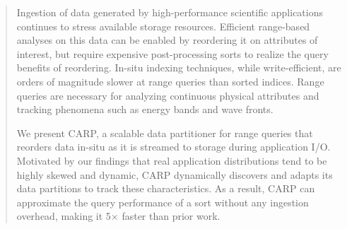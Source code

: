 \begin{abstract}

  Ingestion of data generated by high-performance scientific applications continues to stress available storage resources. Efficient range-based analyses on this data can be enabled by reordering it on attributes of interest, but require expensive post-processing sorts to realize the query benefits of reordering. In-situ indexing techniques, while write-efficient, are orders of magnitude slower at range queries than sorted indices. Range queries are necessary for analyzing continuous physical attributes and tracking phenomena such as energy bands and wave fronts.

We present CARP, a scalable data partitioner for range queries that reorders data in-situ as it is streamed to storage during application I/O. Motivated by our findings that real application distributions tend to be highly skewed and dynamic, CARP dynamically discovers and adapts its data partitions to track these characteristics. As a result, CARP can approximate the query performance of a sort without any ingestion overhead, making it 5$\times$ faster than prior work.

\end{abstract}
